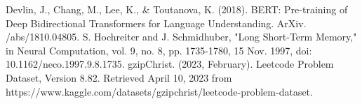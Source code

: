 \documentclass{article}
\begin{document}
{
\small

\begin{thebibliography}{9}
Devlin, J., Chang, M., Lee, K., \& Toutanova, K. (2018). BERT: Pre-training of Deep Bidirectional Transformers for Language Understanding. ArXiv. /abs/1810.04805.
S. Hochreiter and J. Schmidhuber, "Long Short-Term Memory," in Neural Computation, vol. 9, no. 8, pp. 1735-1780, 15 Nov. 1997, doi: 10.1162/neco.1997.9.8.1735.
gzipChrist. (2023, February). Leetcode Problem Dataset, Version 8.82. Retrieved April 10, 2023 from https://www.kaggle.com/datasets/gzipchrist/leetcode-problem-dataset.
\end{thebibliography}
}
%
%
%
\end{document}
